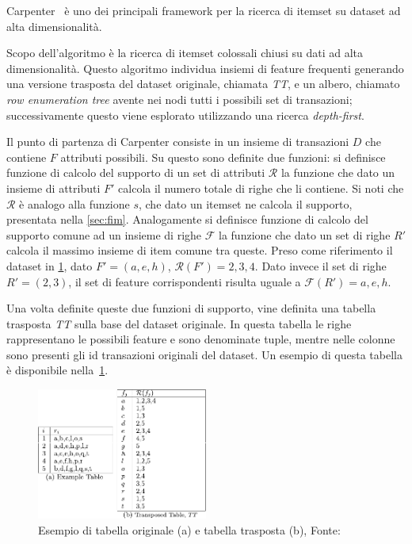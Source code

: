 Carpenter~\cite{pan2003carpenter} è uno dei principali framework per
la ricerca di itemset su dataset ad alta dimensionalità.

Scopo dell'algoritmo è la ricerca di itemset colossali chiusi su dati ad alta dimensionalità.
Questo algoritmo individua insiemi di feature frequenti generando una versione trasposta del dataset originale, chiamata \textit{TT}, e un albero, chiamato \textit{row enumeration tree} avente nei nodi tutti i possibili set di transazioni;
successivamente questo viene esplorato utilizzando una ricerca \textit{depth-first}.

Il punto di partenza di Carpenter consiste in un insieme di transazioni \(D\) che contiene \(F\) attributi possibili.
Su questo sono definite due funzioni: si definisce funzione di calcolo del supporto di un set di attributi \(\mathcal{R}\) la funzione che dato un insieme di attributi \(F'\) calcola il numero totale di righe che li contiene.
Si noti che \(\mathcal{R}\) è analogo alla funzione \(s\), che dato un itemset ne calcola il supporto, presentata nella \cref{sec:fim}.
Analogamente si definisce funzione di calcolo del supporto comune ad un insieme di righe \(\mathcal{F}\) la funzione che dato un set di righe \(R'\) calcola il massimo insieme di item comune tra queste.
Preso come riferimento il dataset in \cref{fig:chap-3:carpenter-tt}, dato \(F' = (a,e,h)\), \(\mathcal{R}(F') = {2,3,4}\).
Dato invece il set di righe \(R' = (2,3)\), il set di feature corrispondenti risulta uguale a \(\mathcal{F}(R') = {a,e,h}\).

Una volta definite queste due funzioni di supporto, vine definita una tabella trasposta \textit{TT} sulla base del dataset originale.
In questa tabella le righe rappresentano le possibili feature e sono denominate tuple, mentre nelle colonne sono presenti gli id transazioni originali del dataset.
Un esempio di questa tabella è disponibile nella~\cref{fig:chap-3:carpenter-tt}.

\begin{figure}
  \centering
  \includegraphics[width=0.5\textwidth]{res/fig/sec-3/DatasetAndTT.pdf}
  \caption{Esempio di tabella originale (a) e tabella trasposta (b), Fonte:~\cite{pan2003carpenter}}%
  \label{fig:chap-3:carpenter-tt}
\end{figure}

